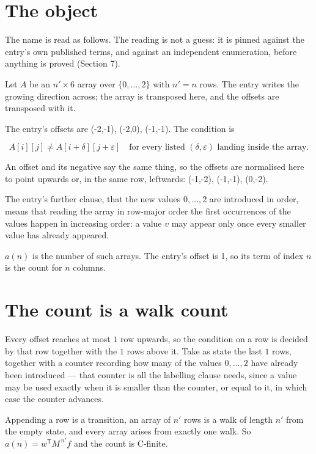 \documentclass[11pt]{article}
\theoremstyle{definition}
\begin{document}
\section{The object}

The name is read as follows. The reading is not a guess: it is pinned against the entry's own published terms, and against an independent enumeration, before anything is proved (Section 7).

Let $A$ be an $n' \times 6$ array over $\{0,\dots,2\}$ with $n' = n$ rows. The entry writes the growing direction across; the array is transposed here, and the offsets are transposed with it.

The entry's offsets are (-2,-1), (-2,0), (-1,-1). The condition is

\[A[i][j] \ne A[i{+}\delta][j{+}\varepsilon]\quad\text{for every listed }(\delta,\varepsilon)\text{ landing inside the array.}\]

An offset and its negative say the same thing, so the offsets are normalised here to point upwards or, in the same row, leftwards: (-1,-2), (-1,-1), (0,-2).

The entry's further clause, that the new values $0,\dots,2$ are introduced in order, means that reading the array in row-major order the first occurrences of the values happen in increasing order: a value $v$ may appear only once every smaller value has already appeared.

$a(n)$ is the number of such arrays. The entry's offset is 1, so its term of index $n$ is the count for $n$ columns.

\section{The count is a walk count}

Every offset reaches at most $1$ row upwards, so the condition on a row is decided by that row together with the $1$ rows above it. Take as state the last $1$ rows, together with a counter recording how many of the values $0,\dots,2$ have already been introduced --- that counter is all the labelling clause needs, since a value may be used exactly when it is smaller than the counter, or equal to it, in which case the counter advances.

Appending a row is a transition, an array of $n'$ rows is a walk of length $n'$ from the empty state, and every array arises from exactly one walk. So $a(n) = w^{\mathsf T}M^{\,n'}f$ and the count is C-finite.
\end{document}
